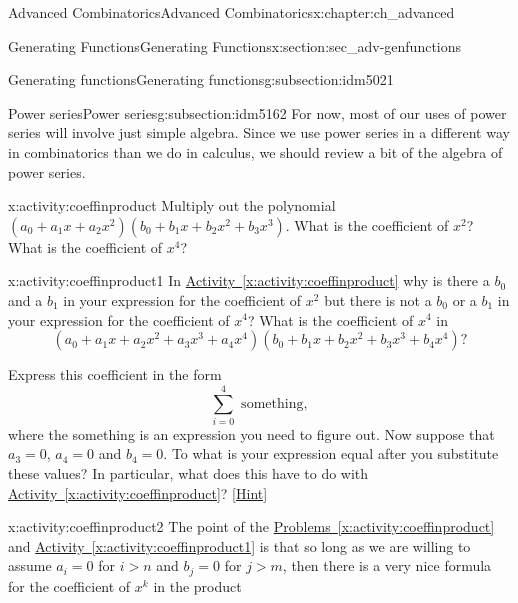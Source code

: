 \documentclass[oneside,10pt,]{book}
\numberwithin{equation}{chapter}
\begin{document}
\begin{chapterptx}{Advanced Combinatorics}{}{Advanced Combinatorics}{}{}{x:chapter:ch_advanced}
\begin{sectionptx}{Generating Functions}{}{Generating Functions}{}{}{x:section:sec_adv-genfunctions}
\begin{subsectionptx}{Generating functions}{}{Generating functions}{}{}{g:subsection:idm5021}
\end{subsectionptx}
%
%
\typeout{************************************************}
\typeout{************************************************}
%
\begin{subsectionptx}{Power series}{}{Power series}{}{}{g:subsection:idm5162}
For now, most of our uses of power series will involve just simple algebra. Since we use power series in a different way in combinatorics than we do in calculus, we should review a bit of the algebra of power series.%
\begin{activity}{}{x:activity:coeffinproduct}%
Multiply out the polynomial \((a_0 +a_1x+a_2x^2)(b_0+b_1x+b_2x^2+b_3x^3)\). What is the coefficient of \(x^2\)? What is the coefficient of \(x^4\)?%
\end{activity}
\begin{activity}{}{x:activity:coeffinproduct1}%
In \hyperref[x:activity:coeffinproduct]{Activity~\ref{x:activity:coeffinproduct}} why is there a \(b_0\) and a \(b_1\) in your expression for the coefficient of \(x^2\) but there is not a \(b_0\) or a \(b_1\) in your expression for the coefficient of \(x^4\)? What is the coefficient of \(x^4\) in%
\begin{equation*}
(a_0+a_1x+a_2x^2+a_3x^3+a_4x^4)(b_0+b_1x+b_2x^2
+b_3x^3+b_4x^4)?
\end{equation*}
%
\par
Express this coefficient in the form%
\begin{equation*}
\sum_{i=0}^4 \mbox{ something} ,
\end{equation*}
where the something is an expression you need to figure out. Now suppose that \(a_3=0\), \(a_4=0\) and \(b_4=0\). To what is your expression equal after you substitute these values? In particular, what does this have to do with \hyperref[x:activity:coeffinproduct]{Activity~\ref{x:activity:coeffinproduct}}?%
\space\hspace*{0pt}\hfill{\tiny\hyperlink{g:hint:idm5195-back}{[Hint]}}\end{activity}
\begin{activity}{}{x:activity:coeffinproduct2}%
The point of the \hyperref[x:activity:coeffinproduct]{Problems~\ref{x:activity:coeffinproduct}} and \hyperref[x:activity:coeffinproduct1]{Activity~\ref{x:activity:coeffinproduct1}} is that so long as we are willing to assume \(a_i=0\) for \(i>n\) and \(b_j =0\) for \(j>m\), then there is a very nice formula for the coefficient of \(x^k\) in the product%
\begin{equation*}

\end{equation*}
\end{activity}
\end{subsectionptx}
\end{sectionptx}
\end{chapterptx}
\end{document}

